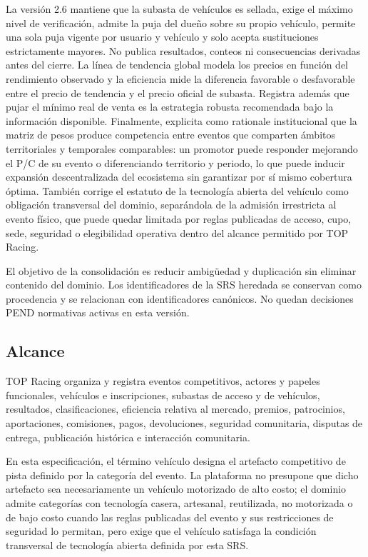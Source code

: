 \documentclass[10pt,letterpaper]{article}
\begin{document}
La versión 2.6 mantiene que la subasta de vehículos es sellada, exige el máximo nivel de verificación, admite la puja del dueño sobre su propio vehículo, permite una sola puja vigente por usuario y vehículo y solo acepta sustituciones estrictamente mayores. No publica resultados, conteos ni consecuencias derivadas antes del cierre. La línea de tendencia global modela los precios en función del rendimiento observado y la eficiencia mide la diferencia favorable o desfavorable entre el precio de tendencia y el precio oficial de subasta. Registra además que pujar el mínimo real de venta es la estrategia robusta recomendada bajo la información disponible. Finalmente, explicita como rationale institucional que la matriz de pesos produce competencia entre eventos que comparten ámbitos territoriales y temporales comparables: un promotor puede responder mejorando el P/C de su evento o diferenciando territorio y periodo, lo que puede inducir expansión descentralizada del ecosistema sin garantizar por sí mismo cobertura óptima. También corrige el estatuto de la tecnología abierta del vehículo como obligación transversal del dominio, separándola de la admisión irrestricta al evento físico, que puede quedar limitada por reglas publicadas de acceso, cupo, sede, seguridad o elegibilidad operativa dentro del alcance permitido por TOP Racing.

El objetivo de la consolidación es reducir ambigüedad y duplicación sin eliminar contenido del dominio. Los identificadores de la SRS heredada se conservan como procedencia y se relacionan con identificadores canónicos. No quedan decisiones PEND normativas activas en esta versión.

\subsection{Alcance}
TOP Racing organiza y registra eventos competitivos, actores y papeles funcionales, vehículos e inscripciones, subastas de acceso y de vehículos, resultados, clasificaciones, eficiencia relativa al mercado, premios, patrocinios, aportaciones, comisiones, pagos, devoluciones, seguridad comunitaria, disputas de entrega, publicación histórica e interacción comunitaria.

En esta especificación, el término vehículo designa el artefacto competitivo de pista definido por la categoría del evento. La plataforma no presupone que dicho artefacto sea necesariamente un vehículo motorizado de alto costo; el dominio admite categorías con tecnología casera, artesanal, reutilizada, no motorizada o de bajo costo cuando las reglas publicadas del evento y sus restricciones de seguridad lo permitan, pero exige que el vehículo satisfaga la condición transversal de tecnología abierta definida por esta SRS.
\end{document}
